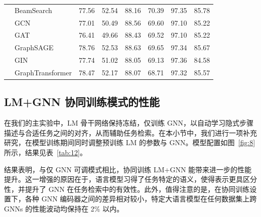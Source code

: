 \documentclass[11pt,UTF8,fontset=fandol]{ctexart}
\begin{document}
\begin{table}[H]
\begin{tabular}{llcc cc cc}
& BeamSearch & 77.56 & 52.54 & 88.16 & 70.39 & 97.35 & 85.78\\
& GCN & 77.01 & 50.49 & 88.56 & 69.60 & 97.10 & 85.22\\
& GAT & 76.41 & 49.66 & 88.43 & 69.52 & 97.10 & 85.22\\
& GraphSAGE & 78.76 & 52.53 & 88.63 & 69.65 & 97.34 & 85.67\\
& GIN & 77.74 & 51.02 & 88.05 & 69.13 & 97.36 & 84.58\\
& GraphTransformer & 78.47 & 52.17 & 88.07 & 68.71 & 97.32 & 85.57\\
\bottomrule
\end{tabular}
\end{table}

\subsection{LM+GNN 协同训练模式的性能}

在我们的主实验中，LM 骨干网络保持冻结，仅训练 GNN，以自动学习隐式步骤描述与合适任务之间的对齐，从而辅助任务检索。在本小节中，我们进行一项补充研究，在模型训练期间同时调整预训练 LM 的参数与 GNN。模型配置如图~\ref{fig:8} 所示，结果见表~\ref{tab:12}。

结果表明，与仅 GNN 可调模式相比，协同训练 LM+GNN 能带来进一步的性能提升。这一增强的原因在于，语言模型习得了任务特定的语义，使得表示更具区分性，并提升了 GNN 在任务检索中的有效性。此外，值得注意的是，在协同训练设置下，各种 GNN 编码器之间的差异相对较小，特定大语言模型在任何数据集上跨 GNNs 的性能波动均保持在 2\% 以内。
\end{document}
